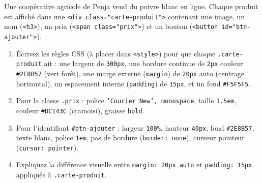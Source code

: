\documentclass[11pt]{article}
\begin{document}
\begin{exercice}
Une coopérative agricole de Penja vend du poivre blanc en ligne. Chaque produit est affiché dans une \texttt{<div class="carte-produit">} contenant une image, un nom (\texttt{<h3>}), un prix (\texttt{<span class="prix">}) et un bouton (\texttt{<button id="btn-ajouter">}).
\begin{enumerate}
    \item Écrivez les règles CSS (à placer dans \texttt{<style>}) pour que chaque \texttt{.carte-produit} ait : une largeur de \texttt{300px}, une bordure continue de \texttt{2px} couleur \texttt{\#2E8B57} (vert forêt), une marge externe (\texttt{margin}) de \texttt{20px} auto (centrage horizontal), un espacement interne (\texttt{padding}) de \texttt{15px}, et un fond \texttt{\#F5F5F5}.
    \item Pour la classe \texttt{.prix} : police \texttt{'Courier New', monospace}, taille \texttt{1.5em}, couleur \texttt{\#DC143C} (cramoisi), graisse \texttt{bold}.
    \item Pour l'identifiant \texttt{\#btn-ajouter} : largeur \texttt{100\%}, hauteur \texttt{40px}, fond \texttt{\#2E8B57}, texte blanc, police \texttt{1em}, pas de bordure (\texttt{border: none}), curseur pointeur (\texttt{cursor: pointer}).
    \item Expliquez la différence visuelle entre \texttt{margin: 20px auto} et \texttt{padding: 15px} appliqués à \texttt{.carte-produit}.
\end{enumerate}
\end{exercice}
\end{document}
